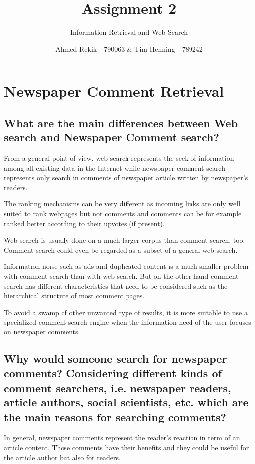 \documentclass{scrartcl}
\title{Assignment 2}
\subtitle{Information Retrieval and Web Search}
\author{Ahmed Rekik - 790063 \& Tim Henning - 789242}
\begin{document}
\maketitle

\setcounter{section}{1}
\section{Newspaper Comment Retrieval}

\subsection{What are the main differences between Web search and Newspaper Comment search?}

From a general point of view, web search represents the seek of information among all existing data in the Internet while newspaper comment search represents only search in comments of newspaper article written by newspaper's readers.

The ranking mechanisms can be very different as incoming links are only well suited to rank webpages but not comments and comments can be for example ranked better according to their upvotes (if present).

Web search is usually done on a much larger corpus than comment search, too. Comment search could even be regarded as a subset of a general web search.

Information noise such as ads and duplicated content is a much smaller problem with comment search than with web search. But on the other hand comment search has different characteristics that need to be considered such as the hierarchical structure of most comment pages.

To avoid a swamp of other unwanted type of results, it is more suitable to use a specialized comment search engine when the information need of the user focuses on newspaper comments.

\subsection{Why would someone search for newspaper comments? Considering different kinds of comment searchers, i.e. newspaper readers, article authors, social scientists, etc. which are the main reasons for searching comments?}

In general, newspaper comments represent the reader's reaction in term of an article content. Those comments have their benefits and they could be useful  for the article author but also for readers.
\end{document}
